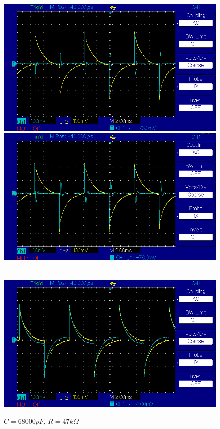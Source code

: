 \documentclass{article}
\begin{document}
\begin{figure}[!h]
        \centering
        \includegraphics[width=\linewidth]{figures/results/resistor_47_Ohm/c3300pF.png}
        \caption{$C = 3300 pF$, $R = 47 k\Omega$}
        \label{img:c33e2_r47}
    \endminipage\hfill
        \centering
        \includegraphics[width=\linewidth]{figures/results/resistor_47_Ohm/c6800pF.png}
        \caption{$C = 6800 pF$, $R = 47 k\Omega$}
        \label{img:c68e2_r47}
    \endminipage\hfill \\
        \centering
        \includegraphics[width=\linewidth]{figures/results/resistor_47_Ohm/c68000pF.png}
        \caption{$C = 68000 pF$, $R = 47 k\Omega$}
        \label{img:c68e3_r47}
    \endminipage\hfill
\end{figure}
\end{document}
